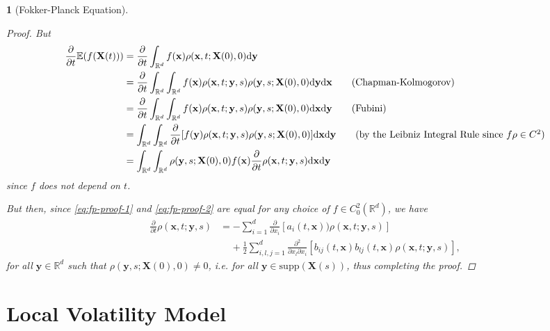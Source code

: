 \documentclass[english]{article}
\numberwithin{equation}{section}
\numberwithin{figure}{section}
\theoremstyle{bolddescit}
\newtheorem{theorem}{\protect\theoremname}[section]
\theoremstyle{definition}
\theoremstyle{definition}
\theoremstyle{plain}
\theoremstyle{plain}
\theoremstyle{bolddesc}
\theoremstyle{plain}
\theoremstyle{remark}
\providecommand{\theoremname}{Theorem}
\begin{document}
\begin{theorem}[Fokker-Planck Equation]
\begin{proof}
    But
    \begin{align}
      \frac{\partial}{\partial t}\mathbb{E}(f(\mathbf{X}(t)))
      &= \frac{\partial}{\partial t}\int_{\mathbb{R}^d} f(\mathbf{x}) \rho(\mathbf{x},t;\mathbf{X}(0),0) \mathrm{d}\mathbf{y}\notag\\
      &= \frac{\partial}{\partial t}\int_{\mathbb{R}^d} \int_{\mathbb{R}^d} f(\mathbf{x}) \rho(\mathbf{x},t;\mathbf{y},s) \rho(\mathbf{y},s;\mathbf{X}(0),0) \mathrm{d}\mathbf{y} \mathrm{d}\mathbf{x}\tag{Chapman-Kolmogorov}\\
      &= \frac{\partial}{\partial t}\int_{\mathbb{R}^d} \int_{\mathbb{R}^d} f(\mathbf{x}) \rho(\mathbf{x},t;\mathbf{y},s) \rho(\mathbf{y},s;\mathbf{X}(0),0) \mathrm{d}\mathbf{x} \mathrm{d}\mathbf{y}\tag{Fubini}\\
      &= \int_{\mathbb{R}^d} \int_{\mathbb{R}^d} \frac{\partial}{\partial t}[f(\mathbf{y}) \rho(\mathbf{x},t;\mathbf{y},s) \rho(\mathbf{y},s;\mathbf{X}(0),0)] \mathrm{d}\mathbf{x} \mathrm{d}\mathbf{y} \tag{by the Leibniz Integral Rule since $f\rho \in C^2$}\\
      &= \int_{\mathbb{R}^d}\int_{\mathbb{R}^d} \rho(\mathbf{y},s;\mathbf{X}(0),0) f(\mathbf{x}) \frac{\partial}{\partial t}\rho(\mathbf{x},t;\mathbf{y},s) \mathrm{d}\mathbf{x} \mathrm{d}\mathbf{y}\label{eq:fp-proof-2}
    \end{align}
    since $f$ does not depend on $t$.

    But then, since \eqref{eq:fp-proof-1} and \eqref{eq:fp-proof-2} are equal for any choice of $f \in C^2_0(\mathbb{R}^d)$, we have
    \begin{align*}
      \frac{\partial}{\partial t}\rho(\mathbf{x},t;\mathbf{y},s)
      &= - \sum_{i=1}^d \frac{\partial}{\partial x_i}[a_i(t,\mathbf{x}))\rho(\mathbf{x},t;\mathbf{y},s)]\\
        &\ \ \ \ \ + \frac{1}{2} \sum_{i,l,j=1}^{d} \frac{\partial^2}{\partial x_l \partial x_i}[b_{ij}(t,\mathbf{x}) b_{lj}(t,\mathbf{x}) \rho(\mathbf{x},t;\mathbf{y},s)],
    \end{align*}
    for all $\mathbf{y} \in \mathbb{R}^d$ such that $\rho(\mathbf{y},s;\mathbf{X}(0),0) \neq 0$, i.e. for all $\mathbf{y} \in \mathrm{supp}(\mathbf{X}(s))$, thus completing the proof.
  \end{proof}
\end{theorem}

\section{Local Volatility Model}
\end{document}
